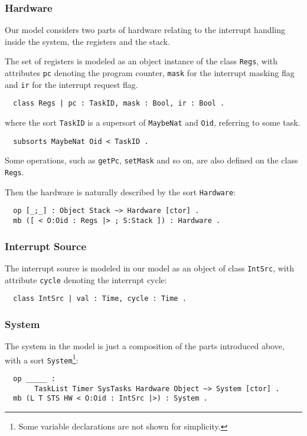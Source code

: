 \documentclass{llncs}
\begin{document}
\subsubsection{Hardware} Our model considers two parts of hardware relating
to the interrupt handling inside the system, the registers and the
stack.

The set of registers is modeled as an object instance of the class
\verb|Regs|, with attributes \verb|pc| denoting the program counter,
\verb|mask| for the interrupt masking flag and \verb|ir| for the
interrupt request flag.
\begin{verbatim}
  class Regs | pc : TaskID, mask : Bool, ir : Bool .
\end{verbatim}
where the sort \verb|TaskID| is a supersort of \verb|MaybeNat| and
\verb|Oid|, referring to some task.
\begin{verbatim}
  subsorts MaybeNat Oid < TaskID .
\end{verbatim}

Some operations, such as \verb|getPc|, \verb|setMask| and so on, are
also defined on the class \verb|Regs|.

Then the hardware is naturally described by the sort \verb|Hardware|:
\begin{verbatim}
  op [_;_] : Object Stack ~> Hardware [ctor] .
  mb ([ < O:Oid : Regs |> ; S:Stack ]) : Hardware .
\end{verbatim}

\subsubsection{Interrupt Source}
The interrupt source is modeled in our model as an object of class \verb|IntSrc|,
with attribute \verb|cycle| denoting the interrupt cycle:
\begin{verbatim}
  class IntSrc | val : Time, cycle : Time .
\end{verbatim}

\subsubsection{System}
The system in the model is just a composition of the parts introduced
above, with a sort \verb|System|\footnote{Some variable declarations
  are not shown for simplicity.}:
\begin{verbatim}
  op _____ : 
       TaskList Timer SysTasks Hardware Object ~> System [ctor] .
  mb (L T STS HW < O:Oid : IntSrc |>) : System .
\end{verbatim}
\end{document}
